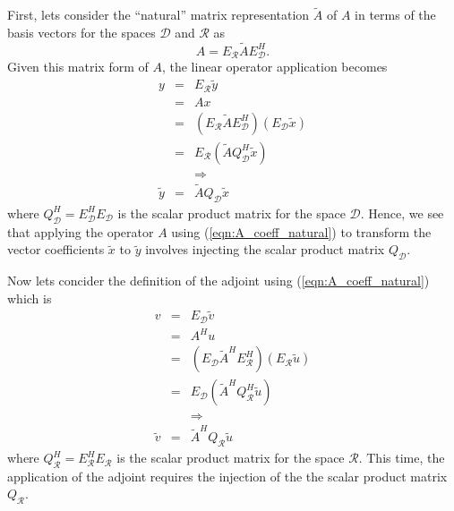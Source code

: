 First, lets consider the ``natural'' matrix representation $\tilde{A}$ of $A$
in terms of the basis vectors for the spaces $\mathcal{D}$ and $\mathcal{R}$
as
%
\begin{equation}
A = E_{\mathcal{R}} \tilde{A} E_{\mathcal{D}}^H.
\label{eqn:A_coeff_natural}
\end{equation}
%
Given this matrix form of $A$, the linear operator application becomes
%
\begin{eqnarray}
y
& = & E_{\mathcal{R}} \tilde{y} \nonumber \\
& = & A x \nonumber \\
& = & ( E_{\mathcal{R}} \tilde{A} E_{\mathcal{D}}^H ) ( E_{\mathcal{D}} \tilde{x} ) \nonumber \\
& = & E_{\mathcal{R}} ( \tilde{A} Q_{\mathcal{D}}^H \tilde{x} ) \nonumber \\
&  & \Rightarrow \nonumber \\
\tilde{y} & = & \tilde{A} Q_{\mathcal{D}} \tilde{x}
\label{eqn:A_natural_apply}
\end{eqnarray}
%
where $Q_{\mathcal{D}}^H = E_{\mathcal{D}}^H E_{\mathcal{D}}$ is the scalar
product matrix for the space $\mathcal{D}$.  Hence, we see that applying the
operator $A$ using (\ref{eqn:A_coeff_natural}) to transform the vector
coefficients $\tilde{x}$ to $\tilde{y}$ involves injecting the scalar product
matrix $Q_{\mathcal{D}}$.

Now lets concider the definition of the adjoint using (\ref{eqn:A_coeff_natural}) which is
%
\begin{eqnarray}
v
& = & E_{\mathcal{D}} \tilde{v} \nonumber \\
& = & A^H u \nonumber \\
& = & ( E_{\mathcal{D}} \tilde{A}^H E_{\mathcal{R}}^H ) ( E_{\mathcal{R}} \tilde{u} ) \nonumber \\
& = & E_{\mathcal{D}} ( \tilde{A}^H Q_{\mathcal{R}}^H \tilde{u} ) \nonumber \\
&  & \Rightarrow \nonumber \\
\tilde{v} & = & \tilde{A}^H Q_{\mathcal{R}} \tilde{u}
\label{eqn:A_natural_apply_adjoint}
\end{eqnarray}
%
where $Q_{\mathcal{R}}^H = E_{\mathcal{R}}^H E_{\mathcal{R}}$ is the scalar
product matrix for the space $\mathcal{R}$.  This time, the application of the
adjoint requires the injection of the the scalar product matrix
$Q_{\mathcal{R}}$.

